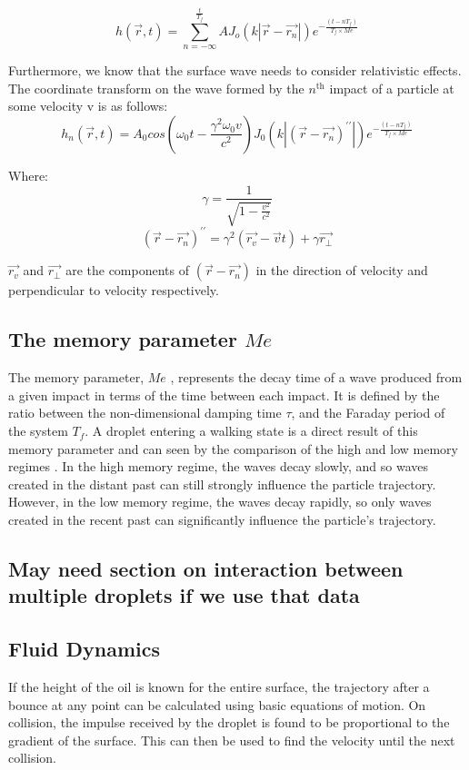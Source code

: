 \begin{equation}
h(\vec{r} , t) = \sum_{n=-\infty}^{\frac{t}{T_f}} A J_o\left(k\left|\vec{r} - \vec{r_n}\right| \right) e^{-\frac{\left(t-n T_f\right)}{T_f\times Me}}
\label{equ:heightSumSurfaceWaves}
\end{equation}

Furthermore, we know that the surface wave needs to consider relativistic effects. The coordinate transform on the wave formed by the $n^{\textrm{th}}$ impact of a particle at some velocity v is as follows:
\begin{equation}
h_n(\vec{r} , t) = A_0 cos\left(\omega_0 t - \frac{\gamma^2 \omega_0 v}{c^2}\right) J_0\left(k \left| \left(\vec{r} - \vec{r_n}\right)^{\prime \prime}  \right| \right)e^{-\frac{\left(t-n T_f\right)}{T_f\times Me}}
\end{equation}

Where:
\begin{equation}
\gamma = \frac{1}{\sqrt{1-\frac{v^2}{c^2}}}
\end{equation}
\begin{equation}
\left(\vec{r} - \vec{r_n}\right)^{\prime \prime} = \gamma^2(\vec{r_v}-\vec{v}t)+\gamma\vec{r_{\perp}}
\end{equation}

$\vec{r_v}$ and $\vec{r_{\perp}}$ are the components of $\left(\vec{r} - \vec{r_n}\right)$ in the direction of velocity and perpendicular to velocity respectively.

\subsection{The memory parameter $Me$}
The memory parameter,  $Me$ , represents the decay time of a wave produced from a given impact in terms of the time between each impact. It is defined by the ratio between the non-dimensional damping time $\tau$, and the Faraday period of the system $T_f$.
A droplet entering a walking state is a direct result of this memory parameter and can seen by the comparison of the high and low memory regimes \cite{couder11}.
In the high memory regime, the waves decay slowly, and so waves created in the distant past can still strongly influence the particle trajectory. However, in the low memory regime, the waves decay rapidly, so only waves created in the recent past can significantly influence the particle's trajectory. 


\subsection{May need section on interaction between multiple droplets if we use that data}
\subsection{Fluid Dynamics}
If the height of the oil is known for the entire surface, the trajectory after a bounce at any point can be calculated using basic equations of motion. On collision, the impulse received by the droplet is found to be proportional to the gradient of the surface. This can then be used to find the velocity until the next collision. 